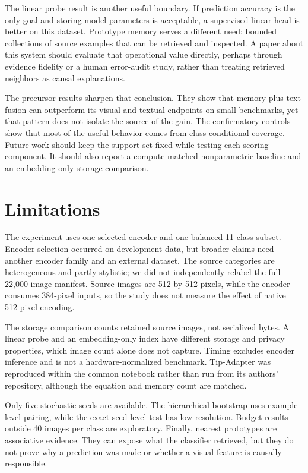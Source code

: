 \documentclass[10pt,twocolumn]{article}
\begin{document}
The linear probe result is another useful boundary. If prediction accuracy is the only
goal and storing model parameters is acceptable, a supervised linear head is better on
this dataset. Prototype memory serves a different need: bounded collections of source
examples that can be retrieved and inspected. A paper about this system should evaluate
that operational value directly, perhaps through evidence fidelity or a human error-audit
study, rather than treating retrieved neighbors as causal explanations.

The precursor results sharpen that conclusion. They show that memory-plus-text fusion
can outperform its visual and textual endpoints on small benchmarks, yet that pattern
does not isolate the source of the gain. The confirmatory controls show that most of the
useful behavior comes from class-conditional coverage. Future work should keep the
support set fixed while testing each scoring component. It should also report a
compute-matched nonparametric baseline and an embedding-only storage comparison.

\section{Limitations}

The experiment uses one selected encoder and one balanced 11-class subset. Encoder
selection occurred on development data, but broader claims need another encoder family
and an external dataset. The source categories are heterogeneous and partly stylistic;
we did not independently relabel the full 22,000-image manifest. Source images are
512 by 512 pixels, while the encoder consumes 384-pixel inputs, so the study does not
measure the effect of native 512-pixel encoding.

The storage comparison counts retained source images, not serialized bytes. A linear
probe and an embedding-only index have different storage and privacy properties, which
image count alone does not capture. Timing excludes encoder inference and is not a
hardware-normalized benchmark. Tip-Adapter was reproduced within the common notebook
rather than run from its authors' repository, although the equation and memory count are
matched.

Only five stochastic seeds are available. The hierarchical bootstrap uses example-level
pairing, while the exact seed-level test has low resolution. Budget results outside
40 images per class are exploratory. Finally, nearest prototypes are associative
evidence. They can expose what the classifier retrieved, but they do not prove why a
prediction was made or whether a visual feature is causally responsible.
\end{document}
